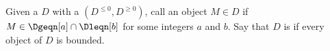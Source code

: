 \begin{definition} \label{definition:bounded_object_bounded_triangulated_category_with_respect_to_a_t_structure}
    Given a  $D$ with a  $(D^{\leq 0}, D^{\geq 0})$, call an object $M \in D$  if $M \in \Dgeqn[a] \cap \Dleqn[b]$ for some integers $a$ and $b$. Say that $D$ is  if every object of $D$ is bounded.
\end{definition}